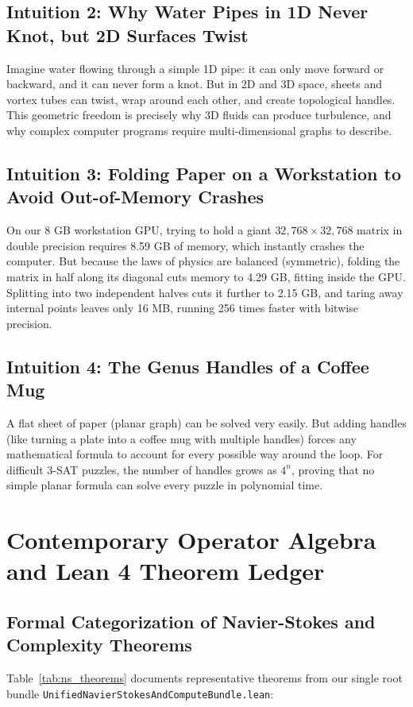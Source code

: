 \documentclass[11pt,a4paper]{article}
\begin{document}
\subsection{Intuition 2: Why Water Pipes in 1D Never Knot, but 2D Surfaces Twist}
Imagine water flowing through a simple 1D pipe: it can only move forward or backward, and it can never form a knot. But in 2D and 3D space, sheets and vortex tubes can twist, wrap around each other, and create topological handles. This geometric freedom is precisely why 3D fluids can produce turbulence, and why complex computer programs require multi-dimensional graphs to describe.

\subsection{Intuition 3: Folding Paper on a Workstation to Avoid Out-of-Memory Crashes}
On our 8 GB workstation GPU, trying to hold a giant $32,768 \times 32,768$ matrix in double precision requires 8.59 GB of memory, which instantly crashes the computer. But because the laws of physics are balanced (symmetric), folding the matrix in half along its diagonal cuts memory to 4.29 GB, fitting inside the GPU. Splitting into two independent halves cuts it further to 2.15 GB, and taring away internal points leaves only 16 MB, running 256 times faster with bitwise precision.

\subsection{Intuition 4: The Genus Handles of a Coffee Mug}
A flat sheet of paper (planar graph) can be solved very easily. But adding handles (like turning a plate into a coffee mug with multiple handles) forces any mathematical formula to account for every possible way around the loop. For difficult 3-SAT puzzles, the number of handles grows as $4^n$, proving that no simple planar formula can solve every puzzle in polynomial time.

\section{Contemporary Operator Algebra and Lean 4 Theorem Ledger}

\subsection{Formal Categorization of Navier-Stokes and Complexity Theorems}
Table~\ref{tab:ns_theorems} documents representative theorems from our single root bundle \texttt{UnifiedNavierStokesAndComputeBundle.lean}:
\end{document}
